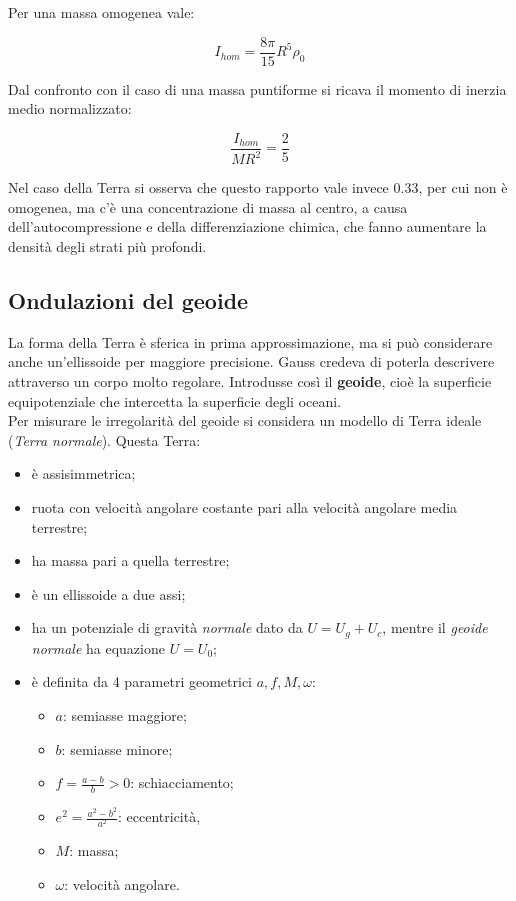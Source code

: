 \documentclass[a4paper,12pt]{book}
\begin{document}
\noindent
Per una massa omogenea vale:

\begin{equation}
    I_{hom} = \frac{8\pi}{15}R^5\rho_0
\end{equation}

\noindent
Dal confronto con il caso di una massa puntiforme si ricava il momento di inerzia medio normalizzato:

\begin{equation}
    \frac{I_{hom}}{MR^2} = \frac{2}{5}
\end{equation}

\noindent
Nel caso della Terra si osserva che questo rapporto vale invece 0.33, per cui non è omogenea, ma c'è una concentrazione di massa al centro, a causa dell'autocompressione e della differenziazione chimica, che fanno aumentare la densità degli strati più profondi.

\subsection{\textcolor{colore7}{Ondulazioni del geoide}}

La forma della Terra è sferica in prima approssimazione, ma si può considerare anche un'ellissoide per maggiore precisione.
Gauss credeva di poterla descrivere attraverso un corpo molto regolare.
Introdusse così il \textbf{geoide}, cioè la superficie equipotenziale che intercetta la superficie degli oceani.\\

\noindent
Per misurare le irregolarità del geoide si considera un modello di Terra ideale (\textit{Terra normale}). Questa Terra:

\begin{itemize}
    \item è assisimmetrica;
    \item ruota con velocità angolare costante pari alla velocità angolare media terrestre;
    \item ha massa pari a quella terrestre;
    \item è un ellissoide a due assi;
    \item ha un potenziale di gravità \textit{normale} dato da $U = U_g + U_c$, mentre il \textit{geoide normale} ha equazione $U=U_0$;
    \item è definita da 4 parametri geometrici $a, f, M, \omega$:
    \begin{itemize}
        \item $a$: semiasse maggiore;
        \item $b$: semiasse minore;
        \item $f = \frac{a-b}{b}>0$: schiacciamento;
        \item $e^2 = \frac{a^2 - b^2}{a^2}$: eccentricità,
        \item $M$: massa;
        \item $\omega$: velocità angolare.
    \end{itemize}
\end{itemize}
\end{document}
